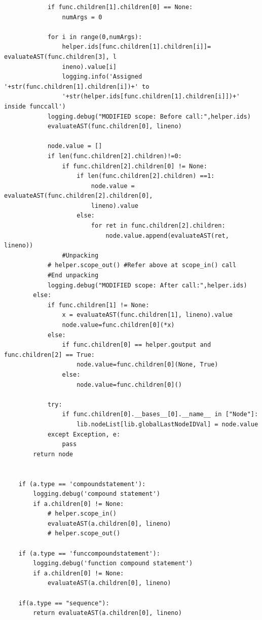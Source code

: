\documentclass[a4paper]{article}
\begin{document}
\begin{verbatim}
            if func.children[1].children[0] == None:
                numArgs = 0
            
            for i in range(0,numArgs):
                helper.ids[func.children[1].children[i]]= evaluateAST(func.children[3], l
                ineno).value[i]
                logging.info('Assigned '+str(func.children[1].children[i])+' to 
                '+str(helper.ids[func.children[1].children[i]])+' inside funccall')
            logging.debug("MODIFIED scope: Before call:",helper.ids)
            evaluateAST(func.children[0], lineno)
            
            node.value = []
            if len(func.children[2].children)!=0:
                if func.children[2].children[0] != None:       
                    if len(func.children[2].children) ==1:
                        node.value = evaluateAST(func.children[2].children[0], 
                        lineno).value
                    else:
                        for ret in func.children[2].children:
                            node.value.append(evaluateAST(ret, lineno))
                #Unpacking
            # helper.scope_out() #Refer above at scope_in() call
            #End unpacking
            logging.debug("MODIFIED scope: After call:",helper.ids)
        else:
            if func.children[1] != None:
                x = evaluateAST(func.children[1], lineno).value
                node.value=func.children[0](*x)
            else:
                if func.children[0] == helper.goutput and func.children[2] == True:
                    node.value=func.children[0](None, True)
                else:    
                    node.value=func.children[0]()                

            try:
                if func.children[0].__bases__[0].__name__ in ["Node"]:
                    lib.nodeList[lib.globalLastNodeIDVal] = node.value
            except Exception, e:
                pass
        return node

        
    if (a.type == 'compoundstatement'):
        logging.debug('compound statement')
        if a.children[0] != None:
            # helper.scope_in()
            evaluateAST(a.children[0], lineno)
            # helper.scope_out()

    if (a.type == 'funccompoundstatement'):
        logging.debug('function compound statement')
        if a.children[0] != None:
            evaluateAST(a.children[0], lineno)

    if(a.type == "sequence"):
        return evaluateAST(a.children[0], lineno)


\end{verbatim}
\end{document}
